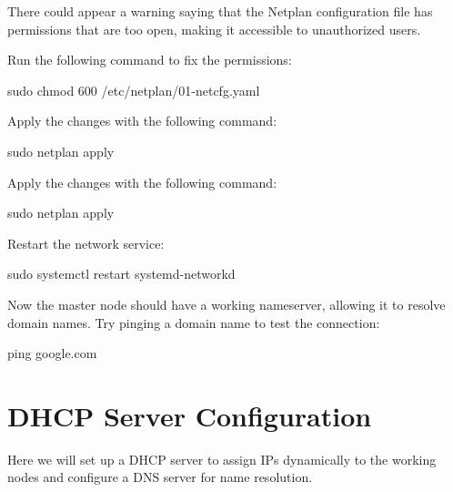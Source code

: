 \begin{warningblock}
There could appear a warning saying that the Netplan configuration file has permissions that are too open, making it accessible to unauthorized users. 

Run the following command to fix the permissions:
\begin{codeblock}[language=bash]
sudo chmod 600 /etc/netplan/01-netcfg.yaml
\end{codeblock}

Apply the changes with the following command:
\begin{codeblock}[language=bash]
sudo netplan apply
\end{codeblock}
\end{warningblock}

Apply the changes with the following command:
\begin{codeblock}[language=bash]
sudo netplan apply
\end{codeblock}

Restart the network service:
\begin{codeblock}[language=bash]
sudo systemctl restart systemd-networkd
\end{codeblock}

Now the master node should have a working nameserver, allowing it to resolve domain names. Try pinging a domain name to test the connection:
\begin{codeblock}[language=bash]
ping google.com
\end{codeblock}

\section{DHCP Server Configuration}

Here we will set up a DHCP server to assign IPs dynamically to the working nodes and configure a DNS server for name resolution.

